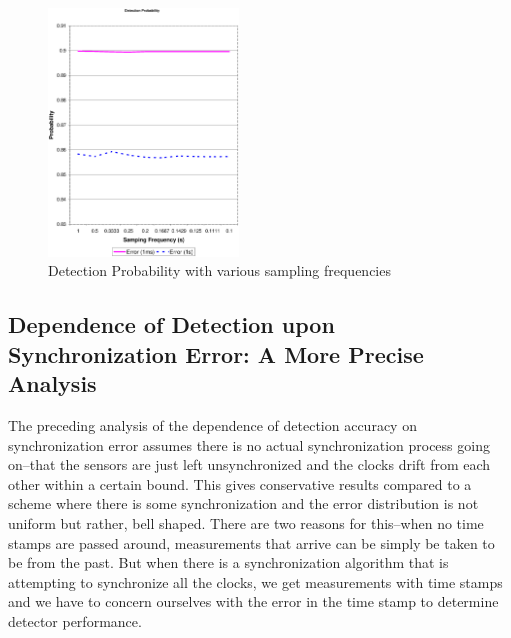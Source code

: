 \begin{figure}
    \begin{center}

    \includegraphics[height=0.3\textheight,width=0.45\textwidth,bbllx=49,bblly=101,bburx=585,bbury=714]{figures/detectionfig}
    \caption{Detection Probability with various sampling frequencies}
        \label{fig:detection}
    \end{center}
\end{figure}
\subsection{Dependence of Detection upon Synchronization Error: A More Precise
Analysis}\label{sec:tighter_analysis} The preceding analysis of the
dependence of detection accuracy on synchronization error assumes
there is no actual synchronization process going on--that the
sensors are just left unsynchronized and the clocks drift from each
other within a certain bound. This gives conservative results
compared to a scheme where there is some synchronization and the
error distribution is not uniform but rather, bell shaped. There are
two reasons for this--when no time stamps are passed around,
measurements that arrive can be simply be taken to be from the past.
But when there is a synchronization algorithm that is attempting to
synchronize all the clocks, we get measurements with time stamps and
we have to concern ourselves with the error in the time stamp to
determine detector performance.

